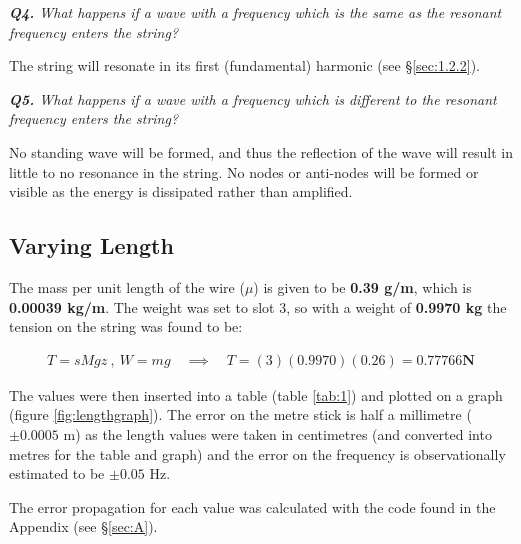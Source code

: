 \documentclass[12pt]{article}
\begin{document}
\textit{\textbf{Q4.} What happens if a wave with a frequency which is the same as the resonant frequency enters the string?}

The string will resonate in its first (fundamental) harmonic (see §\ref{sec:1.2.2}).

\textit{\textbf{Q5.} What happens if a wave with a frequency which is different to the resonant frequency enters the string?}

No standing wave will be formed, and thus the reflection of the wave will result in little to no resonance in the string. No nodes or anti-nodes will be formed or visible as the energy is dissipated rather than amplified.

\subsection{Varying Length} \label{sec:3.2}

The mass per unit length of the wire ($\mu$) is given to be \textbf{0.39 g/m}, which is \textbf{0.00039 kg/m}.
The weight was set to slot 3, so with a weight of \textbf{0.9970 kg} the tension on the string was found to be:

\vspace{-1.5ex}
\begin{gather*}
    T = sMgz \: , \: W = mg \quad \implies \quad T = (3)(0.9970)(0.26) = \mathbf{0.77766 \textbf{N}}
\end{gather*}

The values were then inserted into a table (table \ref{tab:1}) and plotted on a graph (figure \ref{fig:lengthgraph}). The error on the metre stick is half a millimetre ($\pm 0.0005$ m) as the
length values were taken in centimetres (and converted into metres for the table and graph) and the error on the frequency is observationally estimated to be $\pm 0.05$ Hz.

The error propagation for each value was calculated with the code found in the Appendix (see §\ref{sec:A}).
\end{document}
